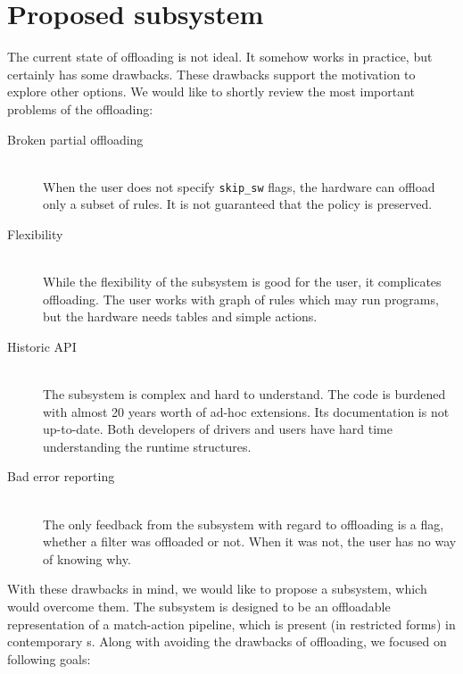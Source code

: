 \chapter{Proposed subsystem}
\label{chap:rfc}

The current state of  offloading is not ideal. It somehow works in
practice, but certainly has some drawbacks. These drawbacks support the
motivation to explore other options. We would like to shortly review the most
important problems of the  offloading:

\begin{description}
	\item[Broken partial offloading] \hfill \\
		When the user does not specify \Verb|skip_sw| flags, the hardware can
		offload only a subset of rules. It is not guaranteed that the policy is
		preserved.
	\item[Flexibility] \hfill \\
		While the flexibility of the  subsystem is good for the user, it
		complicates offloading. The user works with graph of rules which may
		run programs, but the hardware needs tables and simple actions.
	\item[Historic API] \hfill \\
		The  subsystem is complex and hard to understand. The code is
		burdened with almost 20 years worth of ad-hoc extensions. Its
		documentation is not up-to-date. Both developers of drivers and users
		have hard time understanding the runtime structures.
	\item[Bad error reporting] \hfill \\
		The only feedback from the subsystem with regard to offloading is
		a flag, whether a filter was offloaded or not. When it was not, the
		user has no way of knowing why.
\end{description}

\noindent With these drawbacks in mind, we would like to propose a subsystem, which would
overcome them. The subsystem is designed to be an offloadable representation of
a match-action pipeline, which is present (in restricted forms) in contemporary
s. Along with avoiding the drawbacks of  offloading, we focused on
following goals:


